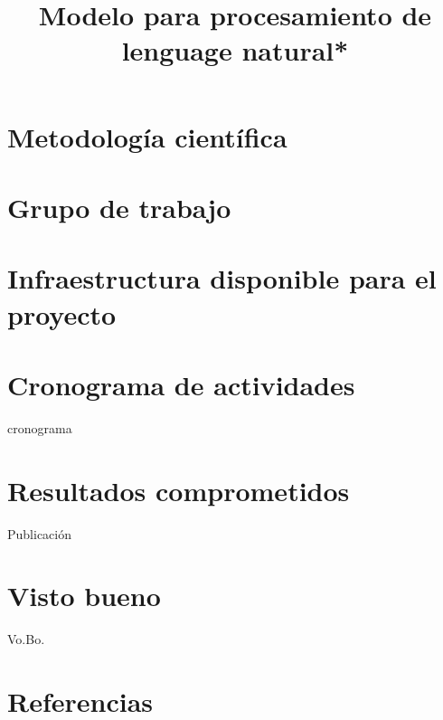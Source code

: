 \documentclass[12pt,letterpaper,final,titlepage]{article}
\title{Modelo para procesamiento de lenguage natural*\citadhi{?}}
\begin{document}
\maketitle





\section {Metodología científica}
\section {Grupo de trabajo}

\section {Infraestructura disponible para el proyecto}

\section {Cronograma de actividades}
cronograma
\section {Resultados comprometidos}
Publicación
\section {Visto bueno}
Vo.Bo.
\section {Referencias}
\printbibliography[heading=none]
\end{document}
